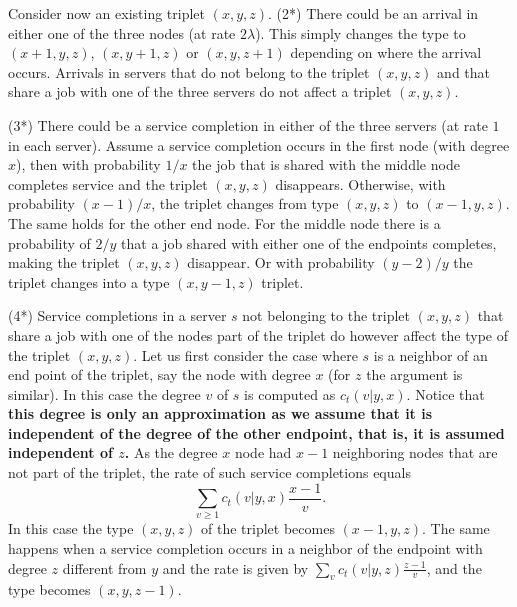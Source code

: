 \documentclass[acmsmall,nonacm]{acmart}
\begin{document}
Consider now an existing triplet $(x,y,z)$. 
(2*) There could be an arrival in either one of the three nodes (at rate $2\lambda$). This simply changes the type to $(x+1,y,z)$,
$(x,y+1,z)$ or $(x,y,z+1)$ depending on where the arrival occurs. Arrivals in servers that do not belong to the
triplet $(x,y,z)$ and that share a job with one of the three servers do not affect  a triplet $(x,y,z)$.

(3*) There could be a service completion in either of the three servers (at rate $1$ in each server). 
Assume a service completion occurs
in the first node (with degree $x$), then with probability $1/x$ the job that is shared with the middle node
completes service and the triplet $(x,y,z)$ disappears. Otherwise, with probability $(x-1)/x$, the triplet
changes from type $(x,y,z)$ to $(x-1,y,z)$. The same holds for the other end node. For the middle node
there is a probability of $2/y$ that a job shared with either one of the endpoints completes, making 
the triplet $(x,y,z)$ disappear. Or with probability $(y-2)/y$ the triplet changes into a type $(x,y-1,z)$
triplet.



(4*) Service completions in a server $s$ not belonging to the triplet $(x,y,z)$ that share a job with one of the nodes part of the
triplet do however affect the type of the triplet $(x,y,z)$. Let us first consider the case where $s$ is a neighbor of an end
point of the triplet, say the node with degree $x$ (for $z$ the argument is similar). In this case the degree $v$ of $s$ is
computed as $c_t(v|y,x)$. Notice that {\bf this degree is only an approximation as we assume that it is independent of
the degree of the other endpoint, that is, it is assumed independent of $z$.} As 
the degree $x$ node had $x-1$ neighboring nodes
that are not part of the triplet, the rate of such service completions equals 
\[ \sum_{v \geq 1} c_t(v|y,x) \frac{x-1}{v}.\]
In this case the type $(x,y,z)$ of the triplet becomes $(x-1,y,z)$. The same happens when a service completion
occurs in a neighbor of the endpoint with degree $z$ different from $y$ and the rate is given by
$ \sum_v c_t(v|y,z) \frac{z-1}{v}$, 
and the type becomes $(x,y,z-1)$.
\end{document}
